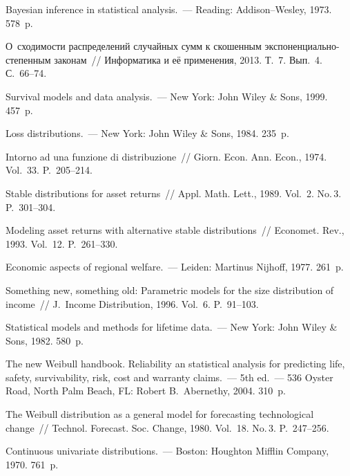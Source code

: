 \begin{multicols}{2}
{{\begin{thebibliography}{99}
 Bayesian inference in statistical analysis.~---
Reading: Addison--Wesley, 1973. 578~p.

О~сходимости распределений случайных сумм к скошенным
экс\-по\-нен\-ци\-а\-ль\-но-сте\-пен\-ным законам~// Информатика и её применения,
2013. Т.~7. Вып.~4. С.~66--74.

 Survival models
and data analysis.~--- New York: John Wiley \& Sons, 1999. 457~p.

 Loss distributions.~--- New York: John
Wiley \& Sons, 1984. 235~p.

 Intorno ad una funzione di distribuzione~//
Giorn. Econ. Ann. Econ., 1974. Vol.~33. P.~205--214.

 Stable distributions for
asset returns~// Appl. Math. Lett., 1989. Vol.~2. No.\,3. P.~301--304.

 Modeling asset returns with alternative
stable distributions~// Economet. Rev., 1993. Vol.~12. P.~261--330.

 Economic aspects of regional welfare.~--- Leiden: Martinus Nijhoff, 1977.
261~p.

Something new, something old: Parametric models for the size
distribution of income~// J.~Income Distribution, 1996. Vol.~6. P.~91--103.

 Statistical models and methods for lifetime data.~--- New
York: John Wiley \& Sons, 1982. 580~p.

 The new Weibull handbook. Reliability an
statistical analysis for predicting life, safety, survivability,
risk, cost and warranty claims.~--- 5th ed.~--- 536 Oyster Road, North
Palm Beach, FL: Robert B.~Abernethy, 2004. 310~p.


 The Weibull distribution as a general
model for forecasting technological change~// Technol.
Forecast. Soc. Change, 1980. Vol.~18. No.\,3. P.~247--256.

 Continuous univariate distributions.~--- Boston: Houghton Mifflin Company, 1970.
761~p.


\end{thebibliography}}}
\end{multicols}

